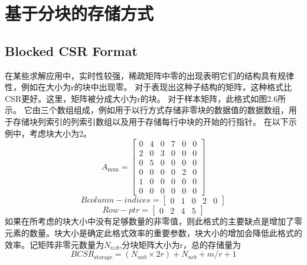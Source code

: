 \documentclass[forprint]{WHUBachelor}
\begin{document}
\section{基于分块的存储方式}
\subsection{Blocked CSR Format}
在某些求解应用中，实时性较强，稀疏矩阵中零的出现表明它们的结构具有规律性，例如在大小为r的块中出现零。 对于表现出这种子结构的矩阵，这种格式比CSR更好\cite{Im2004Sparsity}。这里，矩阵被分成大小为r的块。 对于样本矩阵，此格式如图2.6所示。 它由三个数组组成，例如用于以行方式存储非零块的数据值的数据数组，用于存储块列索引的列索引数组以及用于存储每行中块的开始的行指针。 在以下示例中，考虑块大小为2。
\begin{equation} 
A_{\operatorname{mxn}}=\left[ \begin{array}{cccccc}{0} & {4} & {0} & {7} & {0} & {0} \\ {2} & {0} & {3} & {0} & {0} & {0} \\ {0} & {5} & {0} & {0} & {0} & {0} \\ {0} & {0} & {0} & {0} & {2} & {0} \\ {1} & {0} & {0} & {0} & {0} & {0} \\ {0} & {0} & {0} & {0} & {0} & {0}\end{array}\right]
 \end{equation}
\begin{equation} 
Bcolumn-indices=\left[ \begin{array}{lllll}{0} & {1} & {0} & {2} & {0}\end{array}\right]
 \end{equation}
\begin{equation} 
Row-p t r=\left[ \begin{array}{llll}{0} & {2} & {4} & {5}\end{array}\right]
 \end{equation}
如果在所考虑的块大小中没有足够数量的非零值，则此格式的主要缺点是增加了零元素的数量。块大小是确定此格式效率的重要参数，块大小的增加会降低此格式的效率。记矩阵非零元数量为$N_{nzb}$,分块矩阵大小为r，总的存储量为
\begin{equation} 
B C S R_{\text {storage}}=\left(N_{n a b} \times 2 r\right)+N_{n c b}+m / r+1
 \end{equation}
\end{document}
